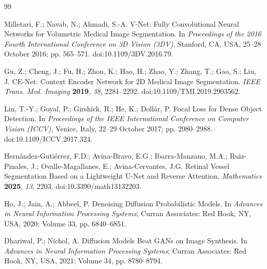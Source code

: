 \documentclass[jimaging,article,submit,pdftex,moreauthors]{Definitions/mdpi}%
\providecommand{\href}[2]{#2}
\begin{document}
\fi

\begin{thebibliography}{99}




Milletari, F.; Navab, N.; Ahmadi, S.-A. V-Net: Fully Convolutional Neural Networks for Volumetric Medical Image Segmentation. In \textit{Proceedings of the 2016 Fourth International Conference on 3D Vision (3DV)}, Stanford, CA, USA, 25--28 October 2016; pp. 565--571. \href{https://doi.org/10.1109/3DV.2016.79}{doi:10.1109/3DV.2016.79}.




Gu, Z.; Cheng, J.; Fu, H.; Zhou, K.; Hao, H.; Zhao, Y.; Zhang, T.; Gao, S.; Liu, J. CE-Net: Context Encoder Network for 2D Medical Image Segmentation. \textit{IEEE Trans. Med. Imaging} \textbf{2019}, \textit{38}, 2281--2292. \href{https://doi.org/10.1109/TMI.2019.2903562}{doi:10.1109/TMI.2019.2903562}.




Lin, T.-Y.; Goyal, P.; Girshick, R.; He, K.; Doll\'ar, P. Focal Loss for Dense Object Detection. In \textit{Proceedings of the IEEE International Conference on Computer Vision (ICCV)}, Venice, Italy, 22--29 October 2017; pp. 2980--2988. \href{https://doi.org/10.1109/ICCV.2017.324}{doi:10.1109/ICCV.2017.324}.




Hern\'andez-Guti\'errez, F.D.; Avina-Bravo, E.G.; Ibarra-Manzano, M.A.; Ruiz-Pinales, J.; Ovalle-Magallanes, E.; Avina-Cervantes, J.G. Retinal Vessel Segmentation Based on a Lightweight U-Net and Reverse Attention. \textit{Mathematics} \textbf{2025}, \textit{13}, 2203. \href{https://doi.org/10.3390/math13132203}{doi:10.3390/math13132203}.




Ho, J.; Jain, A.; Abbeel, P. Denoising Diffusion Probabilistic Models. In \textit{Advances in Neural Information Processing Systems}; Curran Associates: Red Hook, NY, USA, 2020; Volume 33, pp. 6840--6851.




Dhariwal, P.; Nichol, A. Diffusion Models Beat GANs on Image Synthesis. In \textit{Advances in Neural Information Processing Systems}; Curran Associates: Red Hook, NY, USA, 2021; Volume 34, pp. 8780--8794.




\end{thebibliography}
\end{document}
